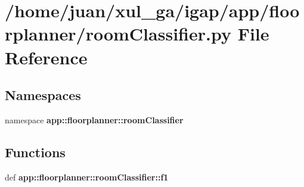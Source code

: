 \section{/home/juan/xul\_\-ga/igap/app/floorplanner/roomClassifier.py File Reference}
\label{roomClassifier_8py}
\subsection*{Namespaces}
\begin{CompactItemize}
\item 
namespace {\bf app::floorplanner::roomClassifier}
\end{CompactItemize}
\subsection*{Functions}
\begin{CompactItemize}
\item 
def {\bf app::floorplanner::roomClassifier::f1}
\end{CompactItemize}
